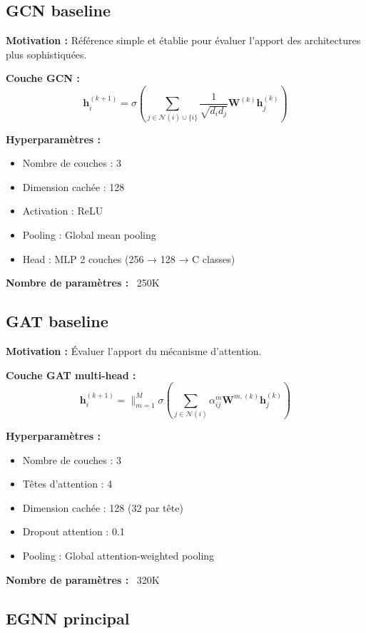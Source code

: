 \subsection{GCN baseline}

\textbf{Motivation :}
Référence simple et établie pour évaluer l'apport des architectures plus sophistiquées.

\textbf{Couche GCN :}
\[
\mathbf{h}_i^{(k+1)} = \sigma\left(\sum_{j \in \mathcal{N}(i) \cup \{i\}} \frac{1}{\sqrt{d_i d_j}} \mathbf{W}^{(k)}\mathbf{h}_j^{(k)}\right)
\]

\textbf{Hyperparamètres :}
\begin{itemize}
    \item Nombre de couches : 3
    \item Dimension cachée : 128
    \item Activation : ReLU
    \item Pooling : Global mean pooling
    \item Head : MLP 2 couches (256 → 128 → C classes)
\end{itemize}

\textbf{Nombre de paramètres :} ~250K

\subsection{GAT baseline}

\textbf{Motivation :}
Évaluer l'apport du mécanisme d'attention.

\textbf{Couche GAT multi-head :}
\[
\mathbf{h}_i^{(k+1)} = \|_{m=1}^M \sigma\left(\sum_{j \in \mathcal{N}(i)} \alpha_{ij}^m \mathbf{W}^{m,(k)}\mathbf{h}_j^{(k)}\right)
\]

\textbf{Hyperparamètres :}
\begin{itemize}
    \item Nombre de couches : 3
    \item Têtes d'attention : 4
    \item Dimension cachée : 128 (32 par tête)
    \item Dropout attention : 0.1
    \item Pooling : Global attention-weighted pooling
\end{itemize}

\textbf{Nombre de paramètres :} ~320K

\subsection{EGNN principal}

